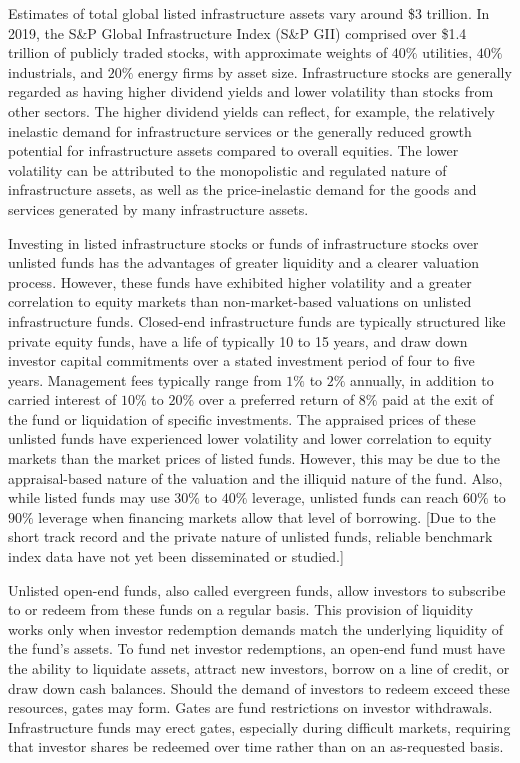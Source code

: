 \documentclass[11pt]{article}
\begin{document}
Estimates of total global listed infrastructure assets vary around \$3 trillion. In 2019, the S\&P Global Infrastructure Index (S\&P GII) comprised over \$1.4 trillion of publicly traded stocks, with approximate weights of $40 \%$ utilities, $40 \%$ industrials, and $20 \%$ energy firms by asset size. Infrastructure stocks are generally regarded as having higher dividend yields and lower volatility than stocks from other sectors. The higher dividend yields can reflect, for example, the relatively inelastic demand for infrastructure services or the generally reduced growth potential for infrastructure assets compared to overall equities. The lower volatility can be attributed to the monopolistic and regulated nature of infrastructure assets, as well as the price-inelastic demand for the goods and services generated by many infrastructure assets.

Investing in listed infrastructure stocks or funds of infrastructure stocks over unlisted funds has the advantages of greater liquidity and a clearer valuation process. However, these funds have exhibited higher volatility and a greater correlation to equity markets than non-market-based valuations on unlisted infrastructure funds. Closed-end infrastructure funds are typically structured like private equity funds, have a life of typically 10 to 15 years, and draw down investor capital commitments over a stated investment period of four to five years. Management fees typically range from $1 \%$ to $2 \%$ annually, in addition to carried interest of $10 \%$ to $20 \%$ over a preferred return of $8 \%$ paid at the exit of the fund or liquidation of specific investments. The appraised prices of these unlisted funds have experienced lower volatility and lower correlation to equity markets than the market prices of listed funds. However, this may be due to the appraisal-based nature of the valuation and the illiquid nature of the fund. Also, while listed funds may use $30 \%$ to $40 \%$ leverage, unlisted funds can reach $60 \%$ to $90 \%$ leverage when financing markets allow that level of borrowing. [Due to the short track record and the private nature of unlisted funds, reliable benchmark index data have not yet been disseminated or studied.]

Unlisted open-end funds, also called evergreen funds, allow investors to subscribe to or redeem from these funds on a regular basis. This provision of liquidity works only when investor redemption demands match the underlying liquidity of the fund's assets. To fund net investor redemptions, an open-end fund must have the ability to liquidate assets, attract new investors, borrow on a line of credit, or draw down cash balances. Should the demand of investors to redeem exceed these resources, gates may form. Gates are fund restrictions on investor withdrawals. Infrastructure funds may erect gates, especially during difficult markets, requiring that investor shares be redeemed over time rather than on an as-requested basis.
\end{document}
